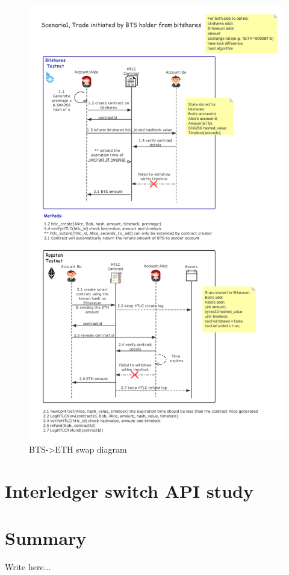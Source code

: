 \begin{figure}[H]
	\includegraphics[width=1\textwidth]{./figures/BTS-ETH_diagram_failed}
        \centering
        \caption{BTS->ETH swap diagram}
        \centering
        \label{fig:failed}

\end{figure}


\section{Interledger switch API study}
\section{Summary}

Write here...
